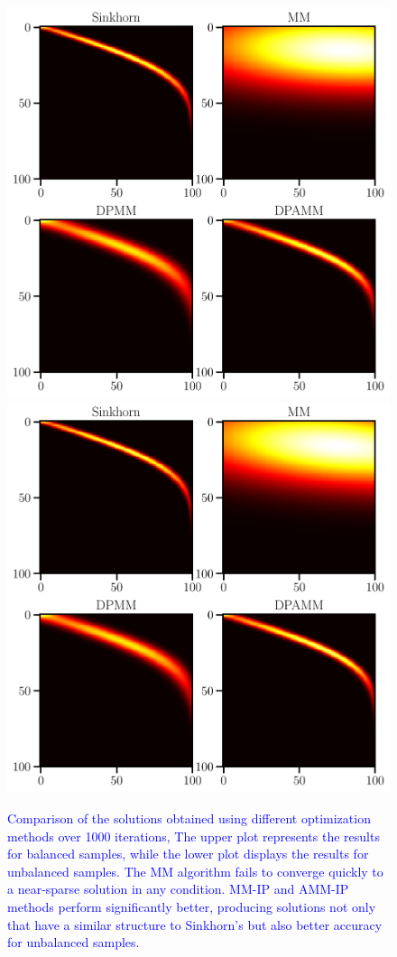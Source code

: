 \documentclass[conference]{IEEEtran}
\newcommand{\changeSX}[1]{\textcolor{blue}{#1}}
\begin{document}
\begin{figure}[tp]
\centering
\includegraphics[width = 0.99\linewidth]{pic/ex2}
\centering
\includegraphics[width = 0.99\linewidth]{pic/ex4}
\setlength{\belowcaptionskip}{-30pt}
\caption{\changeSX{Comparison of the solutions obtained using different optimization methods over 1000 iterations, The upper plot represents the results for balanced samples, while the lower plot displays the results for unbalanced samples. The MM algorithm fails to converge quickly to a near-sparse solution in any condition. MM-IP and AMM-IP methods perform significantly better, producing solutions not only that have a similar structure to Sinkhorn's but also better accuracy for unbalanced samples.}}
\label{Fig:ex2}
\end{figure}
\end{document}
